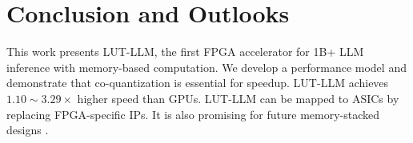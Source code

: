 \documentclass[conference]{IEEEtran}
\begin{document}




\section{Conclusion and Outlooks}

This work presents LUT-LLM, the first FPGA accelerator for 1B+ LLM inference with memory-based computation. We develop a performance model and demonstrate that co-quantization is essential for speedup. LUT-LLM achieves $1.10\sim 3.29\times$ higher speed than GPUs. LUT-LLM can be mapped to ASICs by replacing FPGA-specific IPs. It is also promising for future memory-stacked designs \cite{chiang2025integration}.
\end{document}
